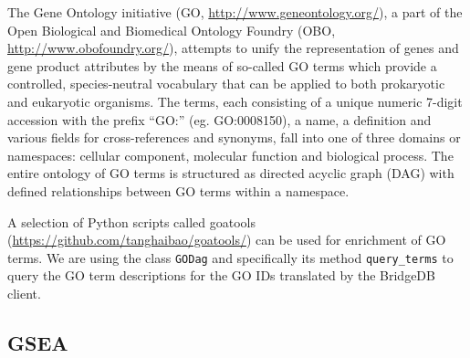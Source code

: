  The Gene Ontology initiative (GO, \url{http://www.geneontology.org/}), a part
of the Open Biological and Biomedical Ontology Foundry (OBO,
\url{http://www.obofoundry.org/}), attempts to unify the representation of genes
and gene product attributes by the means of so-called GO terms which provide a
controlled, species-neutral vocabulary that can be applied to both prokaryotic
and eukaryotic organisms. The terms, each consisting of a unique numeric 7-digit
accession with the prefix ``GO:'' (eg. GO:0008150), a name, a definition and
various fields for cross-references and synonyms, fall into one of three domains
or namespaces: cellular component, molecular function and biological process.
The entire ontology of GO terms is structured as directed acyclic graph (DAG)
with defined relationships between GO terms within a namespace.
  
  A selection of Python scripts called goatools
(\url{https://github.com/tanghaibao/goatools/}) can be used for enrichment of GO
terms. We are using the class \lstinline|GODag| and specifically its method
\lstinline|query_terms| to query the GO term descriptions for the GO IDs
translated by the BridgeDB client.
  
  \subsection{GSEA}
  \label{sec:gsea}
  
